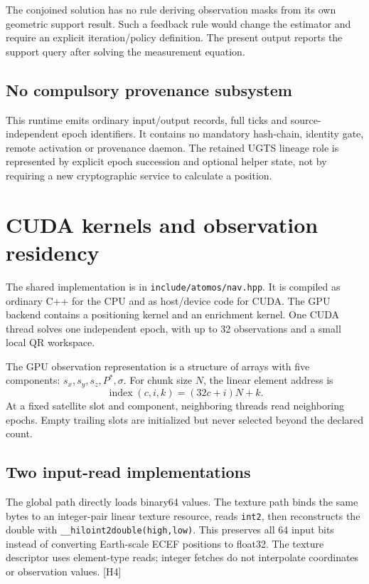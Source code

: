 \documentclass[11pt,a4paper]{article}
\newcommand{\code}[1]{\texttt{#1}}
\begin{document}
The conjoined solution has no rule deriving observation masks from its own geometric support result.
Such a feedback rule would change the estimator and require an explicit iteration/policy definition.
The present output reports the support query after solving the measurement equation.

\subsection{No compulsory provenance subsystem}
This runtime emits ordinary input/output records, full ticks and source-independent epoch identifiers.
It contains no mandatory hash-chain, identity gate, remote activation or provenance daemon. The retained
UGTS lineage role is represented by explicit epoch succession and optional helper state, not by requiring a
new cryptographic service to calculate a position.
\clearpage

\section{CUDA kernels and observation residency}
The shared implementation is in \code{include/atomos/nav.hpp}. It is compiled as ordinary C++ for the CPU
and as host/device code for CUDA. The GPU backend contains a positioning kernel and an enrichment kernel.
One CUDA thread solves one independent epoch, with up to 32 observations and a small local QR workspace.

The GPU observation representation is a structure of arrays with five components:
$s_x,s_y,s_z,P^*,\sigma$. For chunk size $N$, the linear element address is
\begin{equation}
\operatorname{index}(c,i,k)=(32c+i)N+k.
\end{equation}
At a fixed satellite slot and component, neighboring threads read neighboring epochs. Empty trailing slots
are initialized but never selected beyond the declared count.

\subsection{Two input-read implementations}
The global path directly loads binary64 values. The texture path binds the same bytes to an integer-pair
linear texture resource, reads \code{int2}, then reconstructs the double with
\code{\_\_hiloint2double(high,low)}. This preserves all 64 input bits instead of converting Earth-scale ECEF
positions to float32. The texture descriptor uses element-type reads; integer fetches do not interpolate
coordinates or observation values. [H4]
\end{document}
